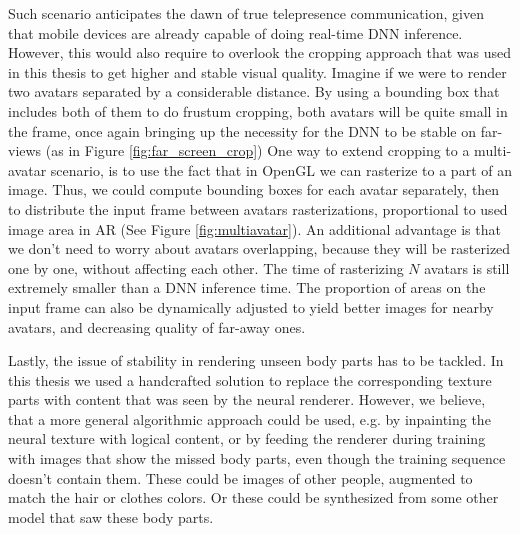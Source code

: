 Such scenario anticipates the dawn of true telepresence communication, given that mobile devices are already capable of doing real-time DNN inference. However, this would also require to overlook the cropping approach that was used in this thesis to get higher and stable visual quality. Imagine if we were to render two avatars separated by a considerable distance. By using a bounding box that includes both of them to do frustum cropping, both avatars will be quite small in the frame, once again bringing up the necessity for the DNN to be stable on far-views (as in Figure \ref{fig:far_screen_crop}) One way to extend cropping to a multi-avatar scenario, is to use the fact that in OpenGL we can rasterize to a part of an image. Thus, we could compute bounding boxes for each avatar separately, then to distribute the input frame between avatars rasterizations, proportional to used image area in AR (See Figure \ref{fig:multiavatar}). An additional advantage is that we don't need to worry about avatars overlapping, because they will be rasterized one by one, without affecting each other. The time of rasterizing $N$ avatars is still extremely smaller than a DNN inference time. The proportion of areas on the input frame can also be dynamically adjusted to yield better images for nearby avatars, and decreasing quality of far-away ones.

Lastly, the issue of stability in rendering unseen body parts has to be tackled. In this thesis we used a handcrafted solution to replace the corresponding texture parts with content that was seen by the neural renderer. However, we believe, that a more general algorithmic approach could be used, e.g. by inpainting the neural texture with logical content, or by feeding the renderer during training with images that show the missed body parts, even though the training sequence doesn't contain them. These could be images of other people, augmented to match the hair or clothes colors. Or these could be synthesized from some other model that saw these body parts.
